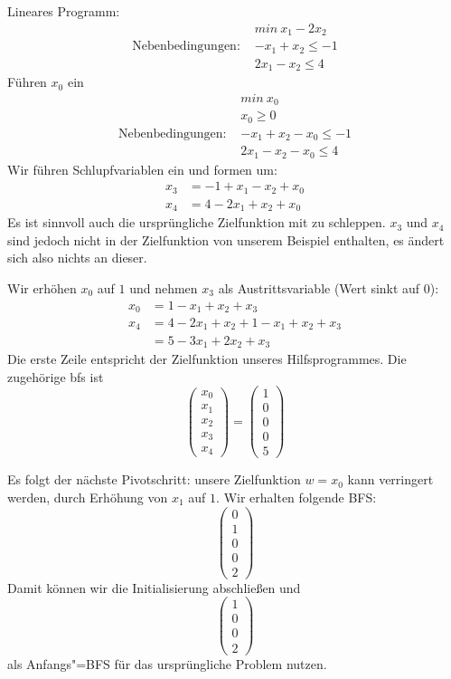 \begin{Bsp}
  \hspace{\parindent}Lineares Programm:
  \begin{align*}
    &min~x_1 - 2x_2\\
    \text{Nebenbedingungen: } & -x_1 + x_2 \le -1\\
    & 2x_1 - x_2 \le 4
  \end{align*}
  Führen $x_0$ ein
  \begin{align*}
    &min~x_0\\
    &x_0 \ge 0\\
    \text{Nebenbedingungen: } & -x_1 + x_2 - x_0\le -1\\
    & 2x_1 - x_2 -x_0\le 4
  \end{align*}
  Wir führen Schlupfvariablen ein und formen um:
  \begin{align*}
    x_3 &= -1 + x_1 -x_2 + x_0\\
    x_4 &= 4 - 2x_1 + x_2 + x_0
  \end{align*}
  Es ist sinnvoll auch die ursprüngliche Zielfunktion mit zu schleppen. $x_3$ und $x_4$ sind jedoch nicht in der Zielfunktion von unserem Beispiel enthalten, es ändert sich also nichts an dieser.
  
  Wir erhöhen $x_0$ auf $1$ und nehmen $x_3$ als Austrittsvariable (Wert sinkt auf $0$):
  \begin{align*}
    x_0 &= 1 - x_1 + x_2 + x_3\\
    x_4 &= 4 -2x_1 + x_2 + 1 -x_1 + x_2 + x_3\\
        &= 5 - 3x_1 + 2x_2 + x_3
  \end{align*}
  Die erste Zeile entspricht der Zielfunktion unseres Hilfsprogrammes. Die zugehörige bfs ist
  \[ \begin{pmatrix} x_0 \\ x_1 \\ x_2 \\ x_3 \\ x_4 \end{pmatrix} = \begin{pmatrix} 1 \\ 0 \\ 0 \\0 \\ 5 \end{pmatrix} \]

  Es folgt der nächste Pivotschritt: unsere Zielfunktion $w=x_0$ kann verringert werden, durch Erhöhung von $x_1$ auf $1$. Wir erhalten folgende BFS:
  \[ \begin{pmatrix} 0 \\ 1 \\ 0 \\ 0 \\ 2 \end{pmatrix} \]
  Damit können wir die Initialisierung abschließen und 
  \[ \begin{pmatrix} 1 \\ 0 \\ 0 \\ 2 \end{pmatrix} \]
  als Anfangs"=BFS für das ursprüngliche Problem nutzen.
  

\end{Bsp}

